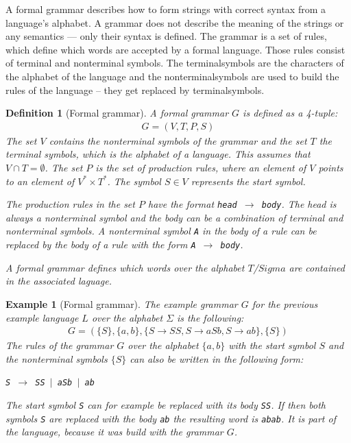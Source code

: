\documentclass[a4paper, 11pt]{article}
\newtheorem*{example*}{Example}
\newtheorem*{definition*}{Definition}
\begin{document}
A formal grammar describes how to form strings with correct syntax from a language's alphabet. A grammar does not describe the meaning of the strings or any semantics — only their syntax is defined. The grammar is a set of rules, which define which words are accepted by a formal language. Those rules consist of terminal and nonterminal symbols. The terminalsymbols are the characters of the alphabet of the language and the nonterminalsymbols are used to build the rules of the language -- they get replaced by terminalsymbols. \cite{CNF, language} 

\begin{definition*}[Formal grammar]
A formal grammar $G$ is defined as a 4-tuple:
\begin{align*}
G = (V, T, P, S)
\end{align*}
The set $V$ contains the nonterminal symbols of the grammar and the set $T$ the terminal symbols, which is the alphabet of a language. This assumes that $V \cap T = \emptyset$. The set $P$ is the set of production rules, where an element of $V$ points to an element of $V^* \times T^*$. The symbol $S \in V$ represents the start symbol. 

The production rules in the set $P$ have the format \texttt{head $\rightarrow$ body}. The head is always a nonterminal symbol and the body can be a combination of terminal and nonterminal symbols. A nonterminal symbol \texttt{A} in the body of a rule can be replaced by the body of a rule with the form \texttt{A $\rightarrow$ body}.
\cite{LS_Ulm}

A formal grammar defines which words over the alphabet $T$/$Sigma$ are contained in the associated laguage.
\end{definition*}

\begin{example*}[Formal grammar]
The example grammar $G$ for the previous example language $L$ over the alphabet $\Sigma$ is the following:
\begin{align*}
G = (\{S\}, \{ a, b \}, \{ S \rightarrow SS, S \rightarrow  aSb, S \rightarrow ab \},  \{ S \})
\end{align*}
The rules of the grammar $G$ over the alphabet $\{a, b\}$ with the start symbol $S$ and the nonterminal symbols $\{ S \}$ can also be written in the following form:
\begin{center}
\texttt{S $\rightarrow$ SS $\mid$  aSb $\mid$ ab}
\end{center}
The start symbol \texttt{S} can for example be replaced with its body \texttt{SS}. If then both symbols \texttt{S} are replaced with the body \texttt{ab} the resulting word is \texttt{abab}. It is part of the language, because it was build with the grammar $G$.
\end{example*}
\end{document}

